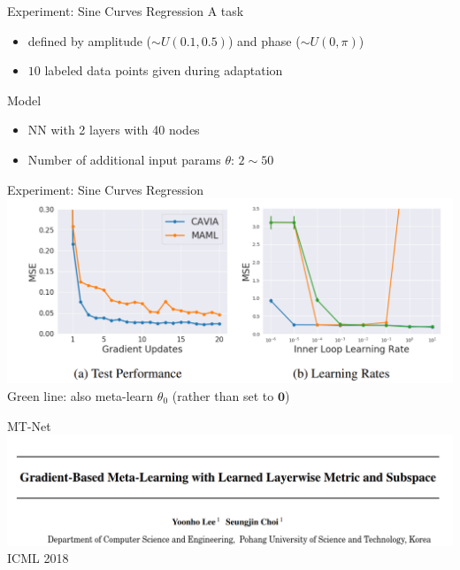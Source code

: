 \documentclass{beamer}
\begin{document}
\begin{frame}{Experiment: Sine Curves Regression}
  A task 
  \begin{itemize}
    \item defined by amplitude ($\sim U(0.1,0.5)$) and phase ($\sim U(0, \pi)$)
    \item $10$ labeled data points given during adaptation
  \end{itemize}
  Model
  \begin{itemize}
    \item NN with 2 layers with 40 nodes
    \item Number of additional input params $\theta$: $2 \sim 50$
  \end{itemize}
\end{frame}

\begin{frame}{Experiment: Sine Curves Regression}
  \center \includegraphics[width=1.0\textwidth]{fig/caml-sine-result.png}
  Green line: also meta-learn $\theta_0$ (rather than set to $\mathbf{0}$)  
\end{frame}

\begin{frame}{MT-Net}
  \includegraphics[width=\textwidth]{fig/title.png}
  \center ICML 2018
\end{frame}
\end{document}
